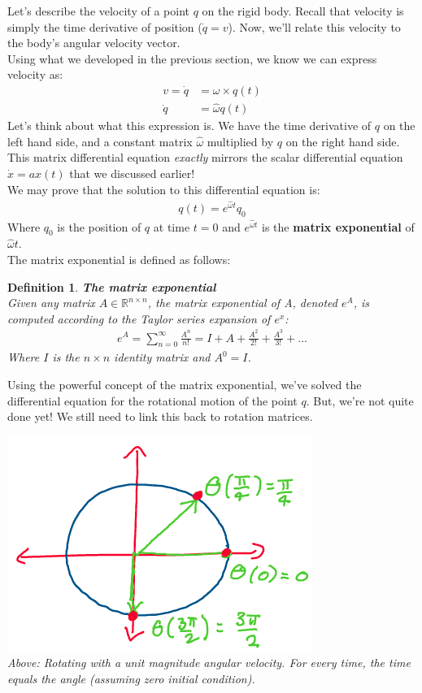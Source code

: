 \documentclass[oneside]{book}
\newtheorem{definition}{Definition}
\newenvironment{defn} %
  {\colorlet{shadecolor}{orange!15}\begin{shaded}\begin{definition}}
  {\end{definition}\end{shaded}}
\begin{document}
Let's describe the velocity of a point $q$ on the rigid body. Recall that velocity is simply the time derivative of position ($\dot{q} = v$). Now, we'll relate this velocity to the body's angular velocity vector.\\
Using what we developed in the previous section, we know we can express velocity as:
\begin{align}
    v = \dot{q} &= \omega \times q(t)\\
    \dot{q} &= \hat{\omega}q(t)
\end{align}
Let's think about what this expression is. We have the time derivative of $q$ on the left hand side, and a constant matrix $\hat\omega$ multiplied by $q$ on the right hand side. This matrix differential equation \textit{exactly} mirrors the scalar differential equation $\dot{x} = ax(t)$ that we discussed earlier!\\
We may prove that the solution to this differential equation is:
\begin{align}
    q(t) = e^{\hat\omega t}q_0
\end{align}
Where $q_0$ is the position of $q$ at time $t = 0$ and $e^{\hat\omega t}$ is the \textbf{matrix exponential} of $\hat\omega t$.\\
The matrix exponential is defined as follows:
\begin{defn}
\textbf{The matrix exponential}\\
Given any matrix $A \in \mathbb{R}^{n\times n}$, the matrix exponential of A, denoted $e^A$, is computed according to the Taylor series expansion of $e^x$: \begin{align}
    e^A = \sum_{n = 0}^{\infty}\frac{A^n}{n!} = I + A + \frac{A^2}{2!} + \frac{A^3}{3!} + ... 
\end{align}
Where $I$ is the $n\times n$ identity matrix and $A^0 = I$.
\end{defn}\noindent
Using the powerful concept of the matrix exponential, we've solved the differential equation for the rotational motion of the point $q$. But, we're not quite done yet! We still need to link this back to rotation matrices.
\begin{center}
    \includegraphics[scale=0.5]{images/unitmag.png}\\
    \textit{Above: Rotating with a unit magnitude angular velocity. For every time, the time equals the angle (assuming zero initial condition).}
\end{center}
\end{document}
